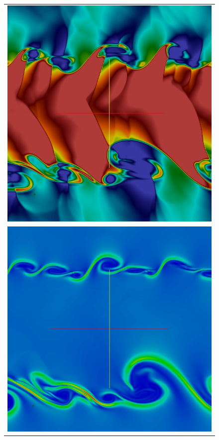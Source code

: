 \begin{figure}[htbp]\figSpace
\begin{center} 
\begin{tabular}{c}
\includegraphics[width=0.4\textheight]{fig/kh_mhd_d_3.jpg} \\ 
\includegraphics[width=0.4\textheight]{fig/kh_mhd_bmag_3.jpg} 

\end{tabular}
\end{center}
\end{figure}
